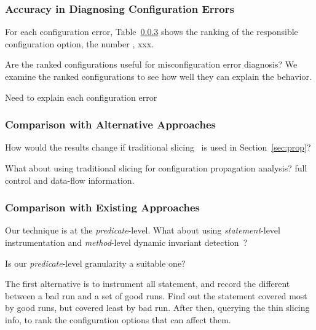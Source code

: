 \subsubsection{Accuracy in Diagnosing Configuration Errors}

For each configuration error, Table~\ref{} shows the ranking of the
responsible configuration option, the number , xxx.


Are the ranked configurations useful for misconfiguration error diagnosis?
We examine the ranked configurations to see how well they can explain the behavior.


Need to explain each configuration error


\subsubsection{Comparison with Alternative Approaches}


How would the results change if traditional slicing~\cite{Horwitz:1988} is used
in Section~\ref{sec:prop}?

What about using traditional slicing for configuration propagation analysis?
full control and data-flow information.

\subsubsection{Comparison with Existing Approaches}%


Our technique is at the \textit{predicate}-level. What about using
\textit{statement}-level instrumentation and \textit{method}-level dynamic invariant detection~\cite{Ernst:1999}?

Is our \textit{predicate}-level granularity a suitable one?

The first alternative is to instrument all statement, and record the different between a bad run and
a set of good runs. Find out the statement covered most by good runs, but covered least by bad run.
After then, querying the thin slicing info, to rank the configuration options that can affect them.


